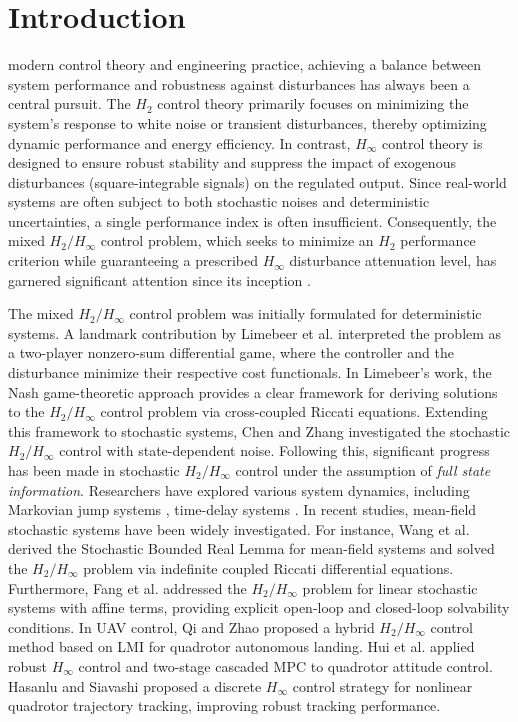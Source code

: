 \documentclass[lettersize,journal]{IEEEtran}
\theoremstyle{plain}
\theoremstyle{definition}
\begin{document}
\section{Introduction}\label{sec1}
 modern control theory and engineering practice,
achieving a balance between system performance and robustness against disturbances has always been a central pursuit. The $H_2$ control theory primarily focuses on minimizing the system's response to white noise or transient disturbances, thereby optimizing dynamic performance and energy efficiency. In contrast, $H_\infty$ control theory is designed to ensure robust stability and suppress the impact of exogenous disturbances (square-integrable signals) on the regulated output. Since real-world systems are often subject to both stochastic noises and deterministic uncertainties, a single performance index is often insufficient. Consequently, the mixed $H_2/H_\infty$ control problem, which seeks to minimize an $H_2$ performance criterion while guaranteeing a prescribed $H_\infty$ disturbance attenuation level, has garnered significant attention since its inception \cite{Bernstein1989, Doyle1989}.

The mixed $H_2/H_\infty$ control problem was initially formulated for deterministic systems. A landmark contribution by Limebeer et al. \cite{Limebeer1994} interpreted the problem as a two-player nonzero-sum differential game, where the controller and the disturbance minimize their respective cost functionals. In Limebeer's work, the Nash game-theoretic approach provides a clear framework for deriving solutions to the $H_2/H_\infty$ control problem via cross-coupled Riccati equations. Extending this framework to stochastic systems, Chen and Zhang \cite{Chen2004} investigated the stochastic $H_2/H_\infty$ control with state-dependent noise. Following this, significant progress has been made in stochastic $H_2/H_\infty$ control under the assumption of \textit{full state information}. Researchers have explored various system dynamics, including Markovian jump systems \cite{Zhang2007, Hou2013, Mei2020}, time-delay systems \cite{Gao2015, Li2018}. In recent studies, mean-field stochastic systems have been widely investigated. For instance, Wang et al. \cite{Wang2023} derived the Stochastic Bounded Real Lemma for mean-field systems and solved the $H_2/H_\infty$ problem via indefinite coupled Riccati differential equations. Furthermore, Fang et al. \cite{Fang2026} addressed the $H_2/H_\infty$ problem for linear stochastic systems with affine terms, providing explicit open-loop and closed-loop solvability conditions. In UAV control, Qi and Zhao \cite{Qi2025} proposed a hybrid $H_2/H_\infty$ control method based on LMI for quadrotor autonomous landing. Hui et al. \cite{Hui2024} applied robust $H_\infty$ control and two-stage cascaded MPC to quadrotor attitude control. Hasanlu and Siavashi \cite{Hasanlu2025} proposed a discrete $H_\infty$ control strategy for nonlinear quadrotor trajectory tracking, improving robust tracking performance.
\end{document}
